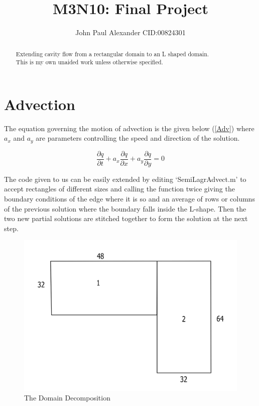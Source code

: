 \documentclass[11pt,a4paper,notitlepage]{article}
\author{John Paul Alexander CID:00824301}
\title{M3N10: Final Project}
\begin{document}
\maketitle
\thispagestyle{empty}

\begin{abstract}
Extending cavity flow from a rectangular domain to an L shaped domain.\\

This is my own unaided work unless otherwise specified.\\

\end{abstract}

\tableofcontents

\newpage
\section{Advection}

The equation governing the motion of advection is the given below (\ref{Adv}) where $a_x$ and $a_y$ are parameters controlling the speed and direction of the solution.

\begin{equation} \label{Adv}
\frac{\partial q}{\partial t} + a_x \frac{\partial q}{\partial x} + a_y \frac{\partial q}{\partial y} = 0
\end{equation}

The code given to us can be easily extended by editing `SemiLagrAdvect.m' to accept rectangles of different sizes and calling the function twice giving the boundary conditions of the edge where it is so and an average of rows or columns of the previous solution where the boundary falls inside the L-shape. Then the two new partial solutions are stitched together to form the solution at the next step.

\begin{figure}[h]
\vspace{-10pt}
\includegraphics[width=.9\linewidth]{LShapeDomain1.jpeg}
\vspace{-20pt}
\caption{The Domain Decomposition}
\end{figure}
\end{document}
